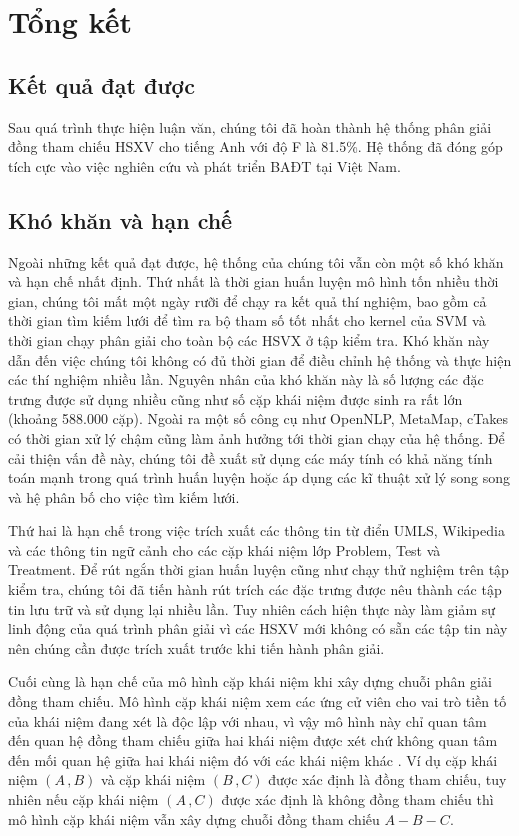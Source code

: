 \chapter{Tổng kết}

\section{Kết quả đạt được}
Sau quá trình thực hiện luận văn, chúng tôi đã hoàn thành hệ thống phân giải đồng tham chiếu HSXV cho tiếng Anh với độ F là 81.5\%. Hệ thống đã đóng góp tích cực vào việc nghiên cứu và phát triển BAĐT tại Việt Nam.

\section{Khó khăn và hạn chế}
Ngoài những kết quả đạt được, hệ thống của chúng tôi vẫn còn một số khó khăn và hạn chế nhất định. Thứ nhất là thời gian huấn luyện mô hình tốn nhiều thời gian, chúng tôi mất một ngày rưỡi để chạy ra kết quả thí nghiệm, bao gồm cả thời gian tìm kiếm lưới để tìm ra bộ tham số tốt nhất cho kernel của SVM và thời gian chạy phân giải cho toàn bộ các HSVX ở tập kiểm tra. Khó khăn này dẫn đến việc chúng tôi không có đủ thời gian để điều chỉnh hệ thống và thực hiện các thí nghiệm nhiều lần. Nguyên nhân của khó khăn này là số lượng các đặc trưng được sử dụng nhiều cũng như số cặp khái niệm được sinh ra rất lớn (khoảng 588.000 cặp). Ngoài ra một số công cụ như OpenNLP, MetaMap, cTakes có thời gian xử lý chậm cũng làm ảnh hưởng tới thời gian chạy của hệ thống. Để cải thiện vấn đề này, chúng tôi đề xuất sử dụng các máy tính có khả năng tính toán mạnh trong quá trình huấn luyện hoặc áp dụng các kĩ thuật xử lý song song và hệ phân bố cho việc tìm kiếm lưới.

Thứ hai là hạn chế trong việc trích xuất các thông tin từ điển UMLS, Wikipedia và các thông tin ngữ cảnh cho các cặp khái niệm lớp Problem, Test và Treatment. Để rút ngắn thời gian huấn luyện cũng như chạy thử nghiệm trên tập kiểm tra, chúng tôi đã tiến hành rút trích các đặc trưng được nêu thành các tập tin lưu trữ và sử dụng lại nhiều lần. Tuy nhiên cách hiện thực này làm giảm sự linh động của quá trình phân giải vì các HSXV mới không có sẵn các tập tin này nên chúng cần được trích xuất trước khi tiến hành phân giải.

Cuối cùng là hạn chế của mô hình cặp khái niệm khi xây dựng chuỗi phân giải đồng tham chiếu. Mô hình cặp khái niệm xem các ứng cử viên cho vai trò tiền tố của khái niệm đang xét là độc lập với nhau, vì vậy mô hình này chỉ quan tâm đến quan hệ đồng tham chiếu giữa hai khái niệm được xét chứ không quan tâm đến mối quan hệ giữa hai khái niệm đó với các khái niệm khác \cite{VincentNg2010}. Ví dụ cặp khái niệm $(A\,,B)$ và cặp khái niệm $(B\,,C)$ được xác định là đồng tham chiếu, tuy nhiên nếu cặp khái niệm $(A\,,C)$ được xác định là không đồng tham chiếu thì mô hình cặp khái niệm vẫn xây dựng chuỗi đồng tham chiếu $A-B-C$.

